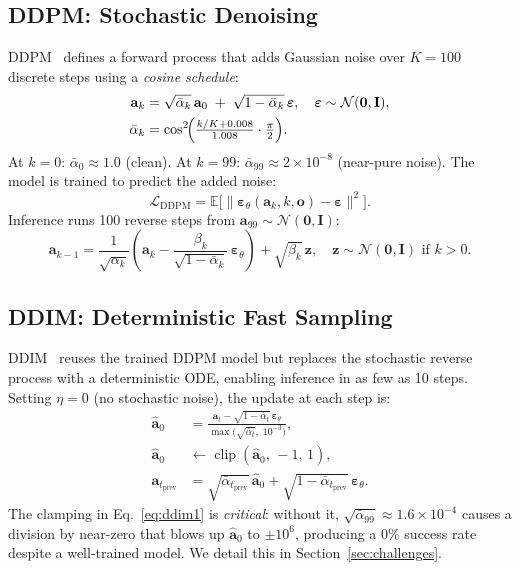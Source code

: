 \documentclass[10pt,letterpaper]{article}
\newcommand{\alphabar}{\bar{\alpha}}
\begin{document}
\subsection{DDPM: Stochastic Denoising}

DDPM~\citep{ho2020ddpm} defines a forward process that adds Gaussian noise over
$K = 100$ discrete steps using a \textit{cosine schedule}:
\begin{align}
  \mathbf{a}_k &= \sqrt{\alphabar_k}\,\mathbf{a}_0 \;+\; \sqrt{1 - \alphabar_k}\,\boldsymbol{\varepsilon},
  \quad \boldsymbol{\varepsilon} \sim \mathcal{N}(\mathbf{0}, \mathbf{I}), \label{eq:fwd} \\
  \alphabar_k &= \cos^2\!\Bigl(\tfrac{k/K + 0.008}{1.008}\cdot\tfrac{\pi}{2}\Bigr). \label{eq:cosine}
\end{align}
At $k{=}0$: $\alphabar_0 \approx 1.0$ (clean). At $k{=}99$: $\alphabar_{99} \approx 2{\times}10^{-8}$
(near-pure noise).
The model is trained to predict the added noise:
\begin{equation}
  \mathcal{L}_{\text{DDPM}} = \mathbb{E}\bigl[
    \|\boldsymbol{\varepsilon}_\theta(\mathbf{a}_k, k, \mathbf{o}) - \boldsymbol{\varepsilon}\|^2
  \bigr].
  \label{eq:ddpm_loss}
\end{equation}
Inference runs 100 reverse steps from $\mathbf{a}_{99} \sim \mathcal{N}(\mathbf{0}, \mathbf{I})$:
\begin{equation}
  \mathbf{a}_{k-1} = \frac{1}{\sqrt{\alpha_k}}\!\left(\mathbf{a}_k - \frac{\beta_k}{\sqrt{1-\alphabar_k}}
  \,\boldsymbol{\varepsilon}_\theta\right) + \sqrt{\beta_k}\,\mathbf{z},
  \quad \mathbf{z} \sim \mathcal{N}(\mathbf{0},\mathbf{I}) \text{ if } k{>}0.
  \label{eq:ddpm_rev}
\end{equation}

\subsection{DDIM: Deterministic Fast Sampling}

DDIM~\citep{song2021ddim} reuses the trained DDPM model but replaces the stochastic
reverse process with a deterministic ODE, enabling inference in as few as 10 steps.
Setting $\eta = 0$ (no stochastic noise), the update at each step is:
\begin{align}
  \hat{\mathbf{a}}_0 &= \frac{\mathbf{a}_t - \sqrt{1{-}\alphabar_t}\,\boldsymbol{\varepsilon}_\theta}
    {\max\!\bigl(\sqrt{\alphabar_t},\; 10^{-3}\bigr)}, \label{eq:ddim1} \\
  \hat{\mathbf{a}}_0 &\leftarrow \operatorname{clip}(\hat{\mathbf{a}}_0,\, -1,\, 1), \label{eq:ddim_clip} \\
  \mathbf{a}_{t_{\text{prev}}} &= \sqrt{\alphabar_{t_{\text{prev}}}}\,\hat{\mathbf{a}}_0
    + \sqrt{1{-}\alphabar_{t_{\text{prev}}}}\,\boldsymbol{\varepsilon}_\theta. \label{eq:ddim2}
\end{align}
The clamping in Eq.~\eqref{eq:ddim1} is \emph{critical}: without it,
$\sqrt{\alphabar_{99}} \approx 1.6{\times}10^{-4}$ causes a division by near-zero
that blows up $\hat{\mathbf{a}}_0$ to ${\pm}10^6$, producing a 0\% success rate despite a
well-trained model. We detail this in Section~\ref{sec:challenges}.
\end{document}
